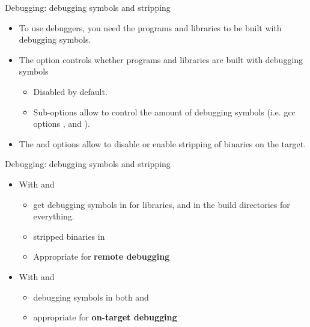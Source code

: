 \begin{frame}{Debugging: debugging symbols and stripping}
  \begin{itemize}
  \item To use debuggers, you need the programs and libraries to be
    built with debugging symbols.
  \item The  option controls whether programs
    and libraries are built with debugging symbols
    \begin{itemize}
    \item Disabled by default.
    \item Sub-options allow to control the amount of debugging symbols
      (i.e. gcc options ,  and ).
    \end{itemize}
  \item The  and  options
    allow to disable or enable stripping of binaries on the target.
  \end{itemize}
\end{frame}

\begin{frame}{Debugging: debugging symbols and stripping}
  \begin{itemize}
  \item With  and 
    \begin{itemize}
    \item get debugging symbols in  for
      libraries, and in the build directories for everything.
    \item stripped binaries in 
    \item Appropriate for {\bf remote debugging}
    \end{itemize}
  \item With  and 
    \begin{itemize}
    \item debugging symbols in both  and
    \item appropriate for {\bf on-target debugging}
    \end{itemize}
  \end{itemize}
\end{frame}

